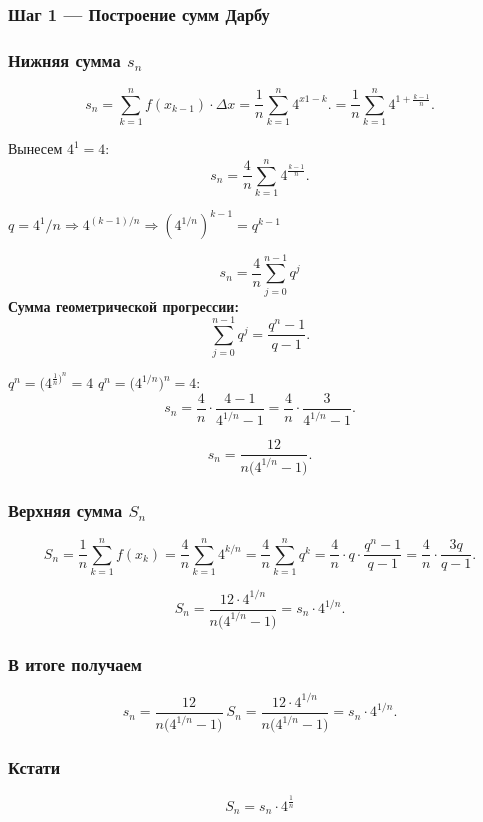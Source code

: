 \documentclass[12pt,a4paper]{article}
\begin{document}
\subsubsection{Шаг 1 --- Построение сумм Дарбу}

\subsubsection*{Нижняя сумма $s_n$}

\[
  s_n = \sum_{k=1}^{n}f(x_{k-1})\cdot\Delta x
      = \frac{1}{n}\sum_{k=1}^{n}4^{x{1-k}}.
      = \frac{1}{n}\sum_{k=1}^{n}4^{1+\frac{k-1}{n}}.
\]

Вынесем $4^1=4$:
\[
  s_n = \frac{4}{n}\sum_{k=1}^{n}4^{\frac{k-1}{n}}.
\]

$q = 4^1/n \Rightarrow 4^{(k-1)/n} \Rightarrow {(4^{1/n})}^{k-1} = q^{k-1}$

\[
  s_n = \frac{4}{n}\sum_{j=0}^{n-1}q^j
\]
\textbf{Сумма геометрической прогрессии:}
\[
  \sum_{j=0}^{n-1}q^j = \frac{q^n-1}{q-1}.
\]

 $q^n = (4^{\frac{1}{n})^n} = 4$
$q^n=\bigl(4^{1/n}\bigr)^n=4$:
\[
  s_n = \frac{4}{n}\cdot\frac{4-1}{4^{1/n}-1}
      = \frac{4}{n}\cdot\frac{3}{4^{1/n}-1}.
\]

\[
  \boxed{s_n = \frac{12}{n\bigl(4^{1/n}-1\bigr)}.}
\]

\subsubsection*{Верхняя сумма $S_n$}

\[
  S_n = \frac{1}{n}\sum_{k=1}^{n}f(x_k)
      = \frac{4}{n}\sum_{k=1}^{n}4^{k/n}
      = \frac{4}{n}\sum_{k=1}^{n}q^k
      = \frac{4}{n}\cdot q\cdot\frac{q^n-1}{q-1}
      = \frac{4}{n}\cdot\frac{3q}{q-1}.
\]


\[
  \boxed{S_n = \frac{12\cdot 4^{1/n}}{n\bigl(4^{1/n}-1\bigr)} = s_n\cdot 4^{1/n}.}
\]

\subsubsection*{В итоге получаем}
\[
    \boxed{s_n = \frac{12}{n\bigl(4^{1/n}-1\bigr)} 
      \   S_n = \frac{12\cdot 4^{1/n}}{n\bigl(4^{1/n}-1\bigr)} = s_n\cdot 4^{1/n}.}
\]
\subsubsection{Кстати}
\[
S_n = s_n \cdot 4^{\frac{1}{n}}
\]
\end{document}
